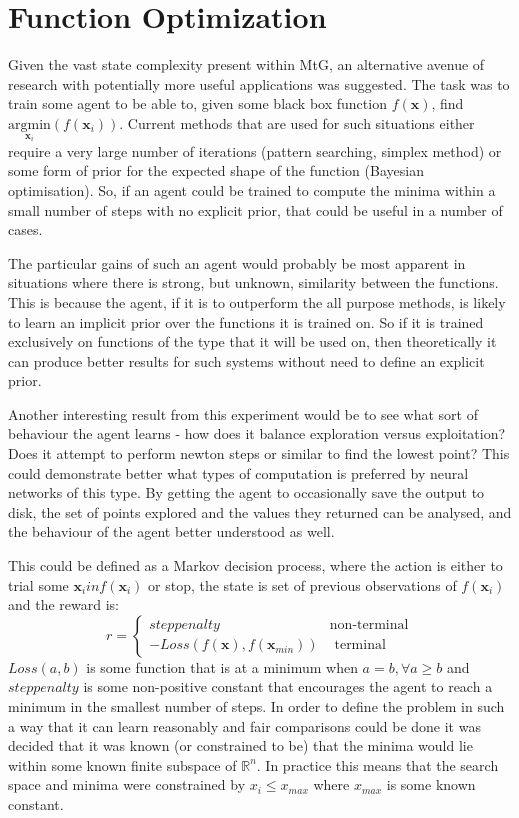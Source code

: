 \section{Function Optimization}
Given the vast state complexity present within MtG, an alternative avenue of research with potentially more useful applications was suggested. The task was to train some agent to be able to, given some black box function $f(\boldsymbol{x})$, find $\underset{\boldsymbol{x}_i}{\text{argmin}} (f(\boldsymbol{x}_i))$. Current methods that are used for such situations either require a very large number of iterations (pattern searching, simplex method) or some form of prior for the expected shape of the function (Bayesian optimisation). So, if an agent could be trained to compute the minima within a small number of steps with no explicit prior, that could be useful in a number of cases.

The particular gains of such an agent would probably be most apparent in situations where there is strong, but unknown, similarity between the functions. This is because the agent, if it is to outperform the all purpose methods, is likely to learn an implicit prior over the functions it is trained on. So if it is trained exclusively on functions of the type that it will be used on, then theoretically it can produce better results for such systems without need to define an explicit prior.

Another interesting result from this experiment would be to see what sort of behaviour the agent learns - how does it balance exploration versus exploitation? Does it attempt to perform newton steps or similar to find the lowest point? This could demonstrate better what types of computation is preferred by neural networks of this type. By getting the agent to occasionally save the output to disk, the set of points explored and the values they returned can be analysed, and the behaviour of the agent better understood as well.


This could be defined as  a Markov decision process, where the action is either to trial some $\boldsymbol{x}_i in f(\boldsymbol{x}_i)$ or stop, the state is set of previous observations of $f(\boldsymbol{x}_i)$ and the reward is: 
\begin{equation*}
r = \begin{cases}
 step penalty&  \text{non-terminal} \\
-Loss(f(\boldsymbol{x}), f(\boldsymbol{x}_{min})) & \text{ terminal}
\end{cases}
\end{equation*}
 $Loss(a,b)$ is some function that is at a minimum when $a = b, \forall a \geq b$ and $step penalty$ is some non-positive constant that encourages the agent to reach a minimum in the smallest number of steps. 
In order to define the problem in such a way that it can learn reasonably and fair comparisons could be done it was decided that it was known (or constrained to be) that the minima would lie within some known finite subspace of $\mathbb{R}^n$. In practice this means that the search space and minima were constrained by $x_i \leq x_{max}$ where $x_{max}$ is some known constant.

